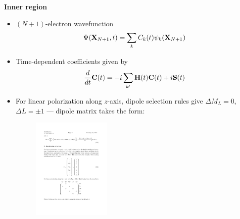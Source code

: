 \documentclass{fancyslides}
\newlength{\wideitemsep}
\let\olditem\item
\renewcommand{\item}{\setlength{\itemsep}{\wideitemsep}\olditem}
\newcommand{\nn}{\nonumber}
\begin{document}
\begin{frame}


\begin{center}
\bf\Large{Inner region}
\end{center}

\small
\begin{itemize}
\item $(N+1)$-electron wavefunction
$$
\small
\Psi({\bf X}_{N+1},t)
= 
\sum_k
C_k(t)
\psi_k({\bf X}_{N+1})
$$
\item Time-dependent coefficients given by
\begin{align}
\frac{d}{dt}{\bf C}(t)
=
-i
\sum_{k'}
{\bf H}(t){\bf C}(t) + i {\bf S}(t)
\nn
\end{align}
\item For linear polarization along $z$-axis, dipole selection rules give $\Delta M_L=0$, $\Delta L=\pm1$ --- dipole matrix takes the form:
\begin{figure}[h]
\centering\includegraphics[width=1.5in]{matrixz.pdf}%
\end{figure} 

\end{itemize}

\end{frame}
%
\end{document}
